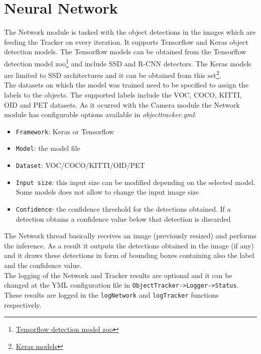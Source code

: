 \section{Neural Network} 
The Network module is tasked with the object detections in the images which are feeding the Tracker on every iteration. It supports Tensorflow and Keras object detection models. The Tensorflow models can be obtained from the Tensorflow detection model zoo\footnote{\href {https://github.com/tensorflow/models/blob/master/research/object_detection/g3doc/detection_model_zoo.md}{Tensorflow detection model zoo}} and include SSD and R-CNN detectors. The Keras models are limited to SSD architectures and it can be obtained from this set\footnote{\href {https://github.com/pierluigiferrari/ssd_keras#download-the-original-trained-model-weights}{Keras models}}.\\
The datasets on which the model was trained need to be specified to assign the labels to the objects. The supported labels include the VOC, COCO, KITTI, OID and PET datasets. As it ocurred with the Camera module the Network module has configurable options available in \textit{objecttracker.yml}:
\begin{itemize}
    \item \texttt{Framework}: Keras or Tensorflow
    \item \texttt{Model}: the model file
    \item \texttt{Dataset}: VOC/COCO/KITTI/OID/PET
    \item \texttt{Input size}: this input size can be modified depending on the selected model. Some models does not allow to change the input image size
    \item \texttt{Confidence}: the confidence threshold for the detections obtained. If a detection obtains a confidence value below that detection is discarded
\end{itemize}
The Network thread basically receives an image (previously resized) and performs the inference. As a result it outputs the detections obtained in the image (if any) and it draws these detections in form of bounding boxes containing also the label and the confidence value.\\
The logging of the Network and Tracker results are optional and it can be changed at the YML configuration file in \texttt{ObjectTracker->Logger->Status}. These results are logged in the \texttt{logNetwork} and \texttt{logTracker} functions respectively.\\

